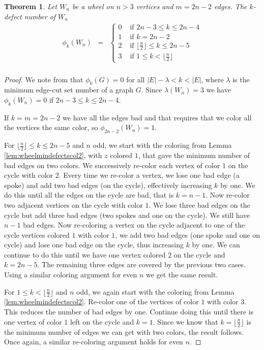 \documentclass[12pt]{amsart}
\newtheorem{theorem}{Theorem}[section]
\theoremstyle{definition}
\theoremstyle{remark}
\numberwithin{equation}{section}
\begin{document}
\begin{theorem}
Let $W_n$ be  a wheel on $n>3$ vertices and $m=2n-2$ edges.
The $k$-defect number of $W_n$
\begin{eqnarray*}
\phi_k(W_n) &=& \begin{cases}0 & \text{ if $2n-3 \leq k \leq 2n-4$}\\
 1 & \text{ if $k =2n-2$ } \\
2 & \text{ if $\lfloor \frac{n}{2}\rfloor \leq k  \leq 2n-5$}\\
3  &\text{ if $1 \leq k <\lfloor  \frac{n}{2}\rfloor $}\end{cases}\\
\end{eqnarray*}
\label{thm:kdefectwheel}
\end{theorem}

\begin{proof}
We note from \cite{KM22} that $\phi_k(G)=0$ for all $|E|-\lambda < k < |E|$, where $\lambda$ is the minimum edge-cut set number of a graph $G$. Since $\lambda(W_n)=3$ we have $\phi_k(W_n)=0$ if $2n-3 \leq k \leq 2n-4$.

If $k=m=2n-2$ we have all the edges bad and that requires that we color all the vertices the same color, so $\phi_{2n-2}(W_n)=1$.

For $\lfloor \frac{n}{2}\rfloor \leq k  \leq 2n-5$ and $n$ odd, we start with the coloring from Lemma \ref{lem:wheelmindefectscol2}, with $z$ colored $1$, that gave the minimum number of bad edges on two colors. We successively re-color each vertex of color $1$ on the cycle with color $2$. Every time we re-color a vertex, we lose one bad edge (a spoke) and add two bad edges (on the cycle), effectively increasing $k$ by one. We do this until all the edges on the cycle are bad, that is $k=n-1$. Now re-color two adjacent vertices on the cycle with color $1$. We lose three bad edges on the cycle but add three bad edges (two spokes and one on the cycle). We still have $n-1$ bad edges. Now re-coloring a vertex on the cycle adjacent to one of the cycle vertices colored $1$ with color $1$, we add two bad edges (one spoke and one on cycle) and lose one bad edge on the cycle, thus increasing $k$ by one. We can continue to do this until we have one vertex colored $2$ on the cycle and $k=2n-5$. The remaining three edges are covered by the previous two cases. Using a similar coloring argument for even $n$ we get the same result.

For $1 \leq k <\lfloor  \frac{n}{2}\rfloor $ and $n$ odd, we again start with the coloring from Lemma \ref{lem:wheelmindefectscol2}. Re-color one of the vertices of color $1$ with color $3$. This reduces the number of bad edges by one. Continue doing this until there is one vertex of color $1$ left on the cycle and $k=1$. Since we know that $k =\lfloor  \frac{n}{2}\rfloor $ is the minimum number of edges we can get with two colors, the result follows. Once again, a similar re-coloring argument holds for even $n$.
\end{proof}
\end{document}
